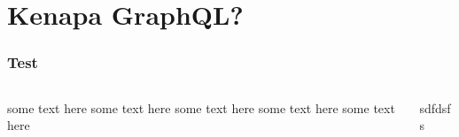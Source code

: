 \documentclass[12pt,xcolor=table]{beamer}
\begin{document}
\section{Kenapa GraphQL?}
\begin{frame}
\frametitle{Test}
\begin{columns}
\begin{column}{0.5\textwidth}
   some text here some text here some text here some text here some text here
\end{column}
\begin{column}{0.5\textwidth}  %
    sdfdsfs
\end{column}
\end{columns}
\end{frame}
\end{document}

